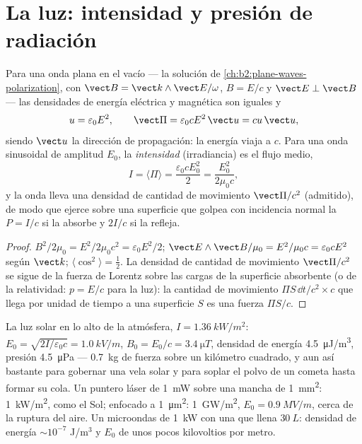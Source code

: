 \section{La luz: intensidad y presión de radiación}

\begin{proposition}\label{prop:b2:poynting-vector:wave}
Para una onda plana en el vacío --- la solución de \cref{ch:b2:plane-waves-polarization},
con $\vect B = \vect k\wedge\vect E/\omega$, $B = E/c$ y $\vect E \perp \vect B$ ---
las densidades de energía eléctrica y magnética son iguales y
\[
u = \varepsilon_0E^2 , \qquad \vect\Pi = \varepsilon_0cE^2\,\vect u = cu\,\vect u ,
\]
siendo $\vect u$ la dirección de propagación: la energía viaja a $c$. Para
una onda sinusoidal de amplitud $E_0$, la \emph{intensidad} (irradiancia)
es el flujo medio,
\[
I = \langle\Pi\rangle = \frac{\varepsilon_0cE_0^2}2 = \frac{E_0^2}{2\mu_0c} ,
\]
y la onda lleva una densidad de cantidad de movimiento $\vect\Pi/c^2$
(admitido), de modo que ejerce sobre una superficie que golpea con
incidencia normal la \emph{} $P = I/c$ si la absorbe y $2I/c$ si la refleja.
\end{proposition}

\begin{proof}
$B^2/2\mu_0 = E^2/2\mu_0c^2 = \varepsilon_0E^2/2$; $\vect E\wedge\vect B/\mu_0 = E^2/\mu_0c =
\varepsilon_0cE^2$ según $\vect k$; $\langle\cos^2\rangle = \tfrac12$. La densidad de
cantidad de movimiento $\vect\Pi/c^2$ se sigue de la fuerza de Lorentz
sobre las cargas de la superficie absorbente (o de la relatividad:
$p = E/c$ para la luz): la cantidad de movimiento $\Pi S\,\dd t/c^2\times c$
que llega por unidad de tiempo a una superficie $S$ es una fuerza $\Pi S/c$.
\end{proof}

\begin{example}\label{ex:b2:poynting-vector:orders}
La luz solar en lo alto de la atmósfera, $I = \qty{1.36}{kW/m^2}$: $E_0 =
\sqrt{2I/\varepsilon_0c} = \qty{1.0}{kV/m}$, $B_0 = E_0/c = \qty{3.4}{\micro T}$, densidad
de energía \qty{4.5}{\micro J/m^3}, presión \qty{4.5}{\micro Pa} --- \qty{0.7}{kg}
de fuerza sobre un kilómetro cuadrado, y aun así bastante para gobernar
una vela solar y para soplar el polvo de un cometa hasta formar su cola.
Un puntero láser de \qty{1}{mW} sobre una mancha de \qty{1}{mm^2}: \qty{1}{kW/m^2}, como el Sol; enfocado a \qty{1}{\micro m^2}:
\qty{1}{GW/m^2}, $E_0 = \qty{0.9}{MV/m}$, cerca de la ruptura del aire. Un
microondas de \qty{1}{kW} con una  que llena $\qty{30}{L}$: densidad
de energía $\sim 10^{-7}$ J/m$^3$ y $E_0$ de unos pocos kilovoltios por metro.
\end{example}

